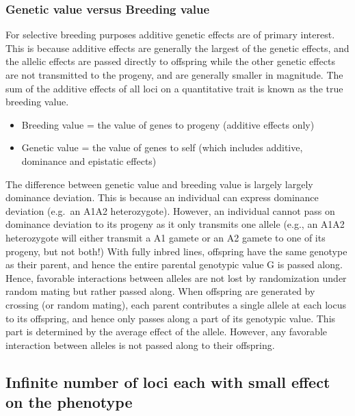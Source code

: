 \documentclass[
]{book}
\begin{document}
\hypertarget{genetic-value-versus-breeding-value}{%
\subsubsection{Genetic value versus Breeding value}\label{genetic-value-versus-breeding-value}}

For selective breeding purposes additive genetic effects are of primary interest. This is because additive effects are generally the largest of the genetic effects, and the allelic effects are passed directly to offspring while the other genetic effects are not transmitted to the progeny, and are generally smaller in magnitude. The sum of the additive effects of all loci on a quantitative trait is known as the true breeding value.

\begin{itemize}
\item
  Breeding value = the value of genes to progeny (additive effects only)
\item
  Genetic value = the value of genes to self (which includes additive, dominance and epistatic effects)
\end{itemize}

The difference between genetic value and breeding value is largely largely dominance deviation. This is because an individual can express dominance deviation (e.g.~an A1A2 heterozygote). However, an individual cannot pass on dominance deviation to its progeny as it only transmits one allele (e.g., an A1A2 heterozygote will either transmit a A1 gamete or an A2 gamete to one of its progeny, but not both!)
With fully inbred lines, offspring have the same genotype as their parent, and hence the entire parental genotypic value G is passed along. Hence, favorable interactions between alleles are not lost by randomization under random mating but rather passed along.
When offspring are generated by crossing (or random mating), each parent contributes a single allele at each locus to its offspring, and hence only passes along a part of its genotypic value. This part is determined by the average effect of the allele. However, any favorable interaction between alleles is not passed along to their offspring.

\hypertarget{infinite-number-of-loci-each-with-small-effect-on-the-phenotype}{%
\subsection{Infinite number of loci each with small effect on the phenotype}\label{infinite-number-of-loci-each-with-small-effect-on-the-phenotype}}
\end{document}

